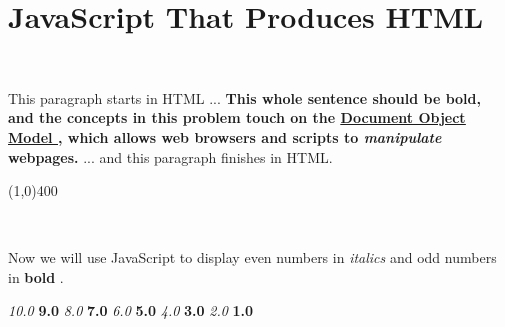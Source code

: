 \documentclass{article}
\begin{document}
\section*{JavaScript That Produces HTML }
~

\noindent This paragraph starts in HTML ... \textbf{This whole sentence should be bold, and the concepts in this problem touch on the \href{http://en.wikipedia.org/wiki/Document_Object_Model}{\underline{Document Object Model }}, which allows web browsers and scripts to \emph{manipulate }webpages. }... and this paragraph finishes in HTML. 
{\begin{center} \line(1,0){400} \end{center}}
~

\noindent Now we will use JavaScript to display even numbers in \emph{italics }and odd numbers in \textbf{bold }. 
~

\noindent 
\emph{10.0 }\textbf{9.0 }\emph{8.0 }\textbf{7.0 }\emph{6.0 }\textbf{5.0 }\emph{4.0 }\textbf{3.0 }\emph{2.0 }\textbf{1.0 }
\end{document}
